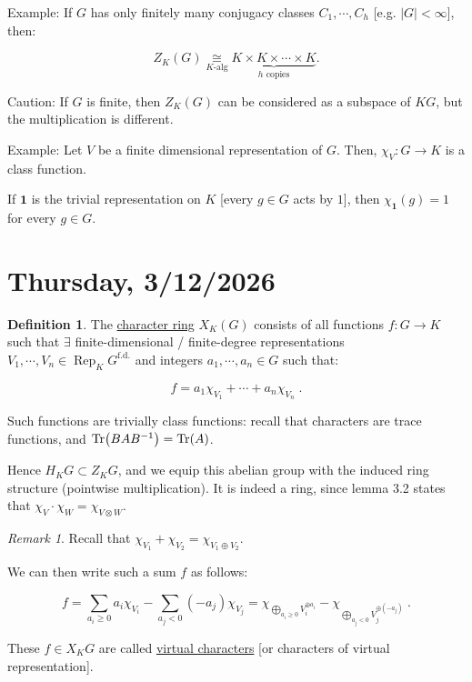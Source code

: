 \documentclass{article}
\theoremstyle{definition}
\newtheorem*{definition}{Definition}
\theoremstyle{plain}
\theoremstyle{remark}
\newtheorem*{remark*}{Remark}
\begin{document}
    Example: If \(G\) has only finitely many conjugacy classes \(C_1 , \cdots , C_h\) [e.g. \(\vert G \vert < \infty\)], then:

    \[
        Z_K(G) \underset{K\text{-alg}}{\cong} \underbrace{K \times K \times \cdots \times K}_{h \text{ copies}}.
    \]

    Caution: If \(G\) is finite, then \(Z_K(G)\) can be considered as a subspace of \(KG\), but the multiplication is different.


    Example: Let \(V\) be a finite dimensional representation of \(G\). Then, \(\chi_V : G \to K\) is a class function.

    If \(\mathbf{1}\) is the trivial representation on \(K\) [every \(g\in G\) acts by \(1\)], then \(\chi_{\textbf{1}}(g) = 1\) for every \(g\in G\).
    
    \section*{Thursday, 3/12/2026}
    
    \begin{definition}
        The \underline{character ring} \(X_K(G)\) consists of all functions \(f: G \to K\) such that \(\exists\) finite-dimensional / finite-degree representations \(V_1 , \cdots , V_n \in \operatorname{Rep}_K G^{\text{f.d.}}\) and integers \(a_1 , \cdots , a_n \in G\) such that:
        
        \[
            f = a_1 \chi_{V_1} + \cdots + a_n \chi_{V_n} \;.
        \]

        Such functions are trivially class functions: recall that characters are trace functions, and \(\Tr(B A B ^{-1}) = \Tr (A)\).

        Hence \(H_K G \subset Z_K G\), and we equip this abelian group with the induced ring structure (pointwise multiplication). It is indeed a ring, since lemma 3.2 states that \(\chi_V \cdot \chi_W = \chi_{V \otimes W}\).

    \end{definition}

    \begin{remark*}

        Recall that \(\chi_{V_1} + \chi_{V_2} = \chi_{V_1 \oplus V_2}\).

        We can then write such a sum \(f\) as follows:

        \[
            f = \sum_{a_i \geq 0} a_i \chi_{V_i} - \sum_{a_j < 0} (-a_j) \chi_{V_j} = \chi_{\bigoplus_{a_i \geq 0} V_i^{\oplus a_i}} - \chi_{\bigoplus_{a_j < 0} V_j^{\oplus (-a_j)}}\;.
        \]

        These \(f\in X_K G\) are called \underline{virtual characters} [or characters of virtual representation].
    \end{remark*}
\end{document}
